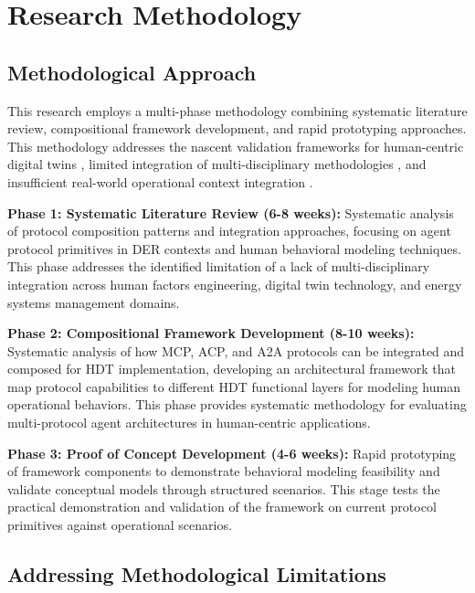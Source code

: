 \documentclass[12pt,a4paper]{article}
\begin{document}
\section{Research Methodology}
\label{sec:methodology}

\subsection{Methodological Approach}

This research employs a multi-phase methodology combining systematic literature review, compositional framework development, and rapid prototyping approaches. This methodology addresses the nascent validation frameworks for human-centric digital twins \cite{10.1109/etfa61755.2024.10711109}, limited integration of multi-disciplinary methodologies \cite{10.1016/j.ifacol.2022.09.675}, and insufficient real-world operational context integration \cite{10.1007/s10207-023-00784-x}.

\textbf{Phase 1: Systematic Literature Review (6-8 weeks):} Systematic analysis of protocol composition patterns and integration approaches, focusing on agent protocol primitives in DER contexts and human behavioral modeling techniques. This phase addresses the identified limitation of a lack of multi-disciplinary integration across human factors engineering, digital twin technology, and energy systems management domains.

\textbf{Phase 2: Compositional Framework Development (8-10 weeks):} Systematic analysis of how MCP, ACP, and A2A protocols can be integrated and composed for HDT implementation, developing an architectural framework that map protocol capabilities to different HDT functional layers for modeling human operational behaviors. This phase provides systematic methodology for evaluating multi-protocol agent architectures in human-centric applications.

\textbf{Phase 3: Proof of Concept Development (4-6 weeks):} Rapid prototyping of framework components to demonstrate behavioral modeling feasibility and validate conceptual models through structured scenarios. This stage tests the practical demonstration and validation of the framework on current protocol primitives against operational scenarios.

\subsection{Addressing Methodological Limitations}
\end{document}
